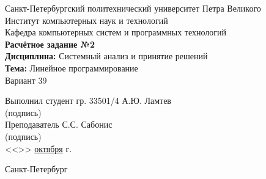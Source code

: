 \begin{titlepage}
\begin{center}
	Санкт-Петербургский политехнический университет Петра Великого\\[0.3cm]
	Институт компьютерных наук и технологий \\[0.3cm]
	Кафедра компьютерных систем и программных технологий\\[4cm]
	
	\textbf{Расчётное задание №2}\\[2mm]
	\textbf{Дисциплина:} Системный анализ и принятие решений\\[2mm]
	\textbf{Тема:} Линейное программирование\\[2mm]
	Вариант 39\\[6.5cm]
\end{center}

\begin{flushleft}
	\hspace*{5mm} Выполнил студент гр. 33501/4  \hspace*{3cm}\sign[3cm]\hspace*{2mm} А.Ю. Ламтев\\
	\hspace*{10.85cm} (подпись)\\[2.5mm]
	\hspace*{5mm} Преподаватель \hspace*{6.45cm}\sign[3cm]\hspace*{2mm} С.С. Сабонис\\
	\hspace*{10.85cm} (подпись)\\[2.5mm]
	\hspace*{11.1cm} <<\underline{\the\day}>> \underline{\hspace{5mm}октября\hspace{5mm}} \the\year\hspace{1mm} г.
\end{flushleft}

\vfill

\begin{center}
	Санкт-Петербург\\
	\the\year
\end{center}
\end{titlepage}
\addtocounter{page}{1}